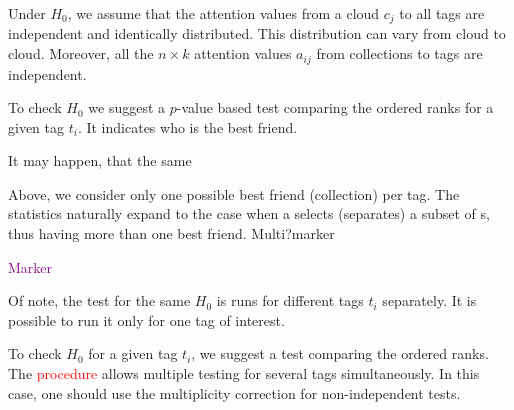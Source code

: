 \documentclass{llncs}
\begin{document}
Under $H_0$, we assume that the attention values from a cloud $c_j$ to all tags are independent and identically distributed.
This distribution can vary from cloud to cloud. Moreover, all the $n \times k$ attention values $a_{ij}$ from collections to tags are independent.

To check $H_0$ we suggest a $p$-value based test comparing the ordered ranks for a given tag $t_i$. It indicates who is the best friend.

It may happen, that the same 

\textcolor{airforceblue}{Above, we consider only one possible best friend (collection) per tag. The statistics naturally expand to the case when a {\tag} selects (separates) a subset of {\collection}s, thus having more than one best friend. Multi?marker}

\textcolor{purple}{Marker}


\textcolor{airforceblue}{Of note, the test for the same $H_0$ is runs for different tags $t_i$ separately. It is possible to run it only for one tag of interest.}

\textcolor{airforceblue}{To check $H_0$ for a given tag $t_i$, we suggest a test comparing the ordered ranks. The \textcolor{red}{procedure} allows multiple testing for several tags simultaneously. In this case, one should use the multiplicity correction for non-independent tests.} 


\end{document}
